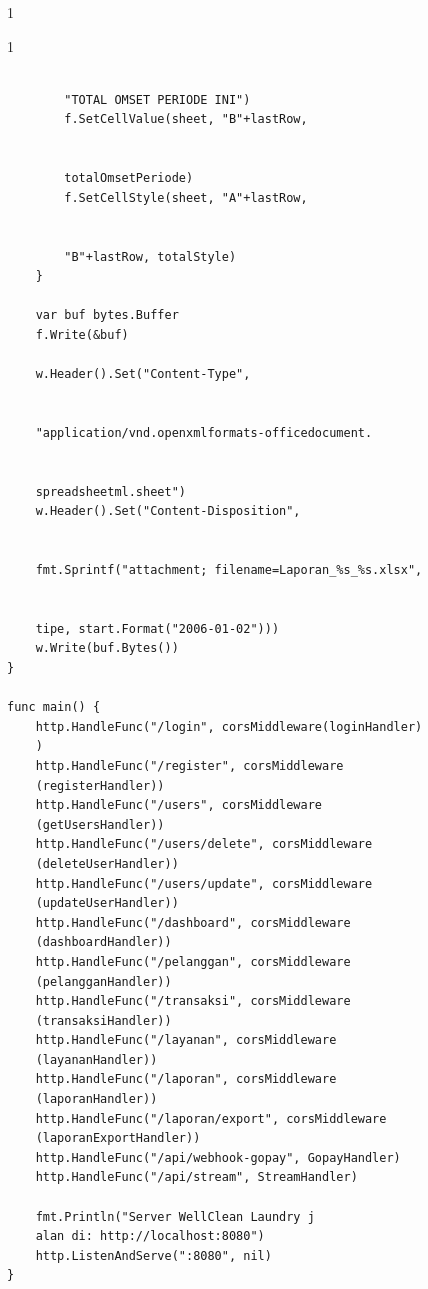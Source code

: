 \begin{enumerate}
\begin{spacing}{1}
\begin{spacing}{1}
\begin{Verbatim}[frame=single, fontsize=\small]
        
        "TOTAL OMSET PERIODE INI")
        f.SetCellValue(sheet, "B"+lastRow, 
        
        
        totalOmsetPeriode)
        f.SetCellStyle(sheet, "A"+lastRow, 
        
        
        "B"+lastRow, totalStyle)
    }

    var buf bytes.Buffer
    f.Write(&buf)

    w.Header().Set("Content-Type", 
    
    
    "application/vnd.openxmlformats-officedocument.
    
    
    spreadsheetml.sheet")
    w.Header().Set("Content-Disposition", 
    
    
    fmt.Sprintf("attachment; filename=Laporan_%s_%s.xlsx", 
    
    
    tipe, start.Format("2006-01-02")))
    w.Write(buf.Bytes())
}

func main() {
    http.HandleFunc("/login", corsMiddleware(loginHandler)
    )
    http.HandleFunc("/register", corsMiddleware
    (registerHandler))
    http.HandleFunc("/users", corsMiddleware
    (getUsersHandler))
    http.HandleFunc("/users/delete", corsMiddleware
    (deleteUserHandler))
    http.HandleFunc("/users/update", corsMiddleware
    (updateUserHandler))
    http.HandleFunc("/dashboard", corsMiddleware
    (dashboardHandler))
    http.HandleFunc("/pelanggan", corsMiddleware
    (pelangganHandler))
    http.HandleFunc("/transaksi", corsMiddleware
    (transaksiHandler))
    http.HandleFunc("/layanan", corsMiddleware
    (layananHandler))
    http.HandleFunc("/laporan", corsMiddleware
    (laporanHandler))
    http.HandleFunc("/laporan/export", corsMiddleware
    (laporanExportHandler))
    http.HandleFunc("/api/webhook-gopay", GopayHandler)
    http.HandleFunc("/api/stream", StreamHandler)

    fmt.Println("Server WellClean Laundry j
    alan di: http://localhost:8080")
    http.ListenAndServe(":8080", nil)
}
\end{Verbatim}



\end{spacing}
\end{spacing}
\end{enumerate}
